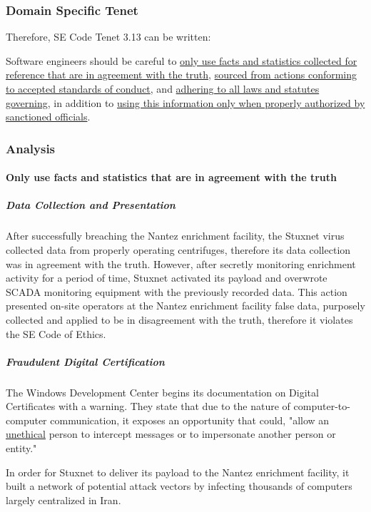 \documentclass[12pt]{article}
\begin{document}
\begin{multicols}{2}
\subsubsection{Domain Specific Tenet}

Therefore, SE Code Tenet 3.13 can be written:
\begin{framed}
Software engineers should be careful to \ul{only use facts and statistics collected for reference that are in agreement with the truth}, \ul{sourced from actions conforming to accepted standards of conduct}, and \ul{adhering to all laws and statutes governing}, in addition to \ul{using this information only when properly authorized by sanctioned officials}.
\end{framed}

\subsubsection{Analysis}

\paragraph{Only use facts and statistics that are in agreement with the truth}

\subparagraph{Data Collection and Presentation}

After successfully breaching the Nantez enrichment facility, the Stuxnet virus collected data from properly operating centrifuges, therefore its data collection was in agreement with the truth. However, after secretly monitoring enrichment activity for a period of time, Stuxnet activated its payload and overwrote SCADA monitoring equipment with the previously recorded data.\cite{toKillACentrifuge} This action presented on-site operators at the Nantez enrichment facility false data, purposely collected and applied to be in disagreement with the truth, therefore it violates the SE Code of Ethics.

\subparagraph{Fraudulent Digital Certification}

The Windows Development Center begins its documentation on Digital Certificates with a warning. They state that due to the nature of computer-to-computer communication, it exposes an opportunity that could, "allow an \ul{unethical} person to intercept messages or to impersonate another person or entity."\cite{moreOnDigitalCertificates}

In order for Stuxnet to deliver its payload to the Nantez enrichment facility, it built a network of potential attack vectors by infecting thousands of computers largely centralized in Iran.\cite{lessonsFromStuxnet}


\end{multicols}
\end{document}
